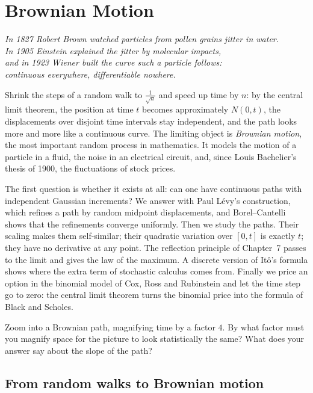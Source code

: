 \chapter{Brownian Motion}

\begin{center}\itshape
In 1827 Robert Brown watched particles from pollen grains jitter in water.\\
In 1905 Einstein explained the jitter by molecular impacts,\\
and in 1923 Wiener built the curve such a particle follows:\\
continuous everywhere, differentiable nowhere.
\end{center}

Shrink the steps of a random walk to $\frac1{\sqrt n}$ and speed up time by $n$: by the central limit theorem, the position at time $t$
becomes approximately $N(0,t)$, the displacements over disjoint time intervals stay independent, and the path looks
more and more like a continuous curve. The limiting object is \emph{Brownian motion}, the most important random
process in mathematics. It models the motion of a particle in a fluid, the noise in an electrical circuit, and, since
Louis Bachelier's thesis of 1900, the fluctuations of stock prices.

The first question is whether it exists at all: can one have continuous paths with independent Gaussian increments?
We answer with Paul L\'evy's construction, which refines a path by random midpoint displacements, and Borel--Cantelli
shows that the refinements converge uniformly. Then we study the paths. Their scaling makes them self-similar; their
quadratic variation over $[0,t]$ is exactly $t$; they have no derivative at any point. The reflection principle of Chapter~7
passes to the limit and gives the law of the maximum. A discrete version of It\^o's formula shows where the extra
term of stochastic calculus comes from. Finally we price an option in the binomial model of Cox, Ross and
Rubinstein and let the time step go to zero: the central limit theorem turns the binomial price into the formula of
Black and Scholes.

\begin{think}
Zoom into a Brownian path, magnifying time by a factor $4$. By what factor must you magnify space for the picture to
look statistically the same? What does your answer say about the slope of the path?
\end{think}

\section{From random walks to Brownian motion}

